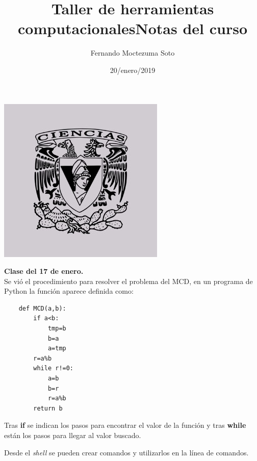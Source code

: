 \documentclass[etterpaper, 12pt, oneside]{article}%
\title{\Huge Taller de herramientas computacionales}
\author{Fernando Moctezuma Soto}
\date{20/enero/2019}
\begin{document}
	\maketitle
	
	\begin{center}
		\includegraphics[scale=0.40]{1.jpg}
	\end{center}
	
	\newpage
	
	\title{\Huge Notas del curso\\}
	
	\textbf{Clase del 17 de enero.}\\
	
	
	Se vió el procedimiento para resolver el problema del MCD, en un programa de Python la función aparece definida como:
	
	\begin{verbatim}
	def MCD(a,b):
		if a<b:
			tmp=b
			b=a
			a=tmp
		r=a%b
		while r!=0:
			a=b
			b=r
			r=a%b
		return b
	\end{verbatim}
	
	Tras \textbf{if} se indican los pasos para encontrar el valor de la función y tras \textbf{while} están los pasos para llegar al valor buscado.
	
	Desde el \emph{shell} se pueden crear comandos y utilizarlos en la línea de comandos.
	
	
	

	
\end{document}
